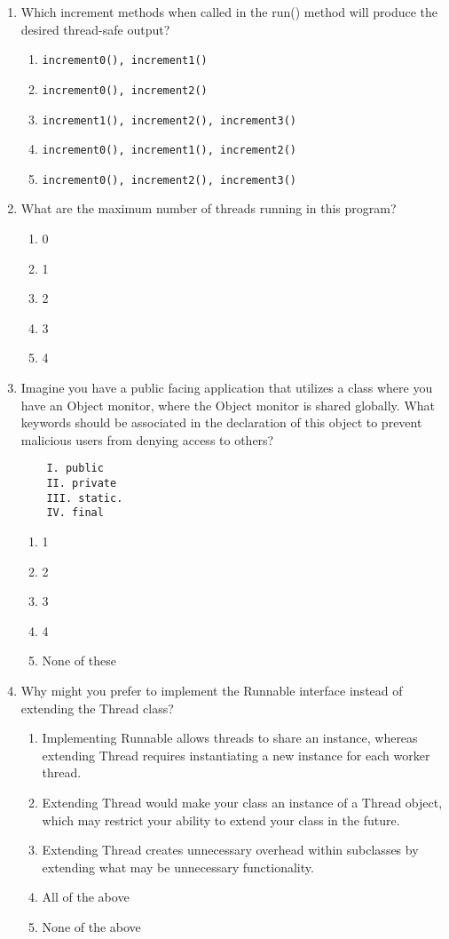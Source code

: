 \documentclass[S17-Final.tex]{subfiles}
\begin{document}
\begin{enumerate}
\item Which increment methods when called in the run() method will produce the desired thread-safe output?
	
\begin{enumerate}
\item  \texttt{increment0(), increment1()}
\item  \texttt{increment0(), increment2()}
\item  \texttt{increment1(), increment2(), increment3()}
\item  \texttt{increment0(), increment1(), increment2()}
\item  \texttt{increment0(), increment2(), increment3()}
\end{enumerate}

\item What are the maximum number of threads running in this program?

\begin{enumerate}
\item  0
\item  1
\item  2
\item  3
\item  4
\end{enumerate}
\clearpage
\item Imagine you have a public facing application that utilizes a class where you have an Object monitor, where the Object monitor is shared globally. What keywords should be associated in the declaration of this object to prevent malicious users from denying access to others?
\begin{lstlisting}
    I. public
    II. private
    III. static.
    IV. final
\end{lstlisting}
	
\begin{enumerate}
\item  1
\item  2
\item  3
\item  4
\item  None of these
\end{enumerate}

\item Why might you prefer to implement the Runnable interface instead of extending the Thread class?
	
\begin{enumerate}
\item  Implementing Runnable allows threads to share an instance, whereas extending Thread requires instantiating a new instance for each worker thread.
\item  Extending Thread would make your class an instance of a Thread object, which may restrict your ability to extend your class in the future.
\item  Extending Thread creates unnecessary overhead within subclasses by extending what may be unnecessary functionality.
\item  All of the above
\item  None of the above
\end{enumerate}


\end{enumerate}
\end{document}

